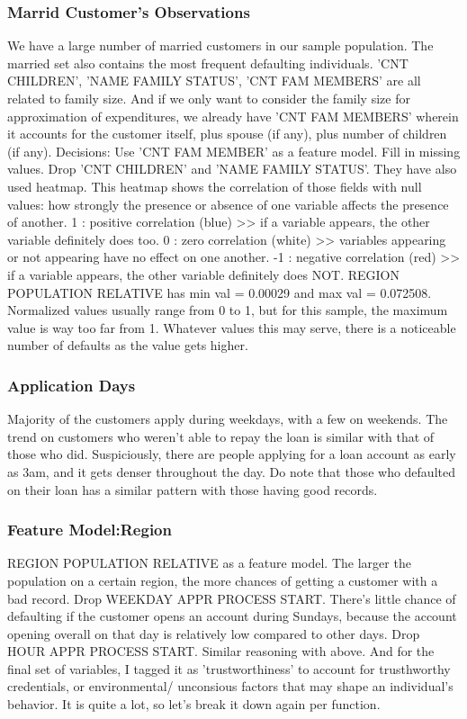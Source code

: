 \documentclass[twoside,a4paper]{article}
\begin{document}
\subsubsection{Marrid Customer's Observations}
We have a large number of married customers in our sample population. The married set also contains the most frequent defaulting individuals.
'CNT CHILDREN', 'NAME FAMILY STATUS', 'CNT FAM MEMBERS' are all related to family size. And if we only want to consider the family size for approximation of expenditures, we already have 'CNT FAM MEMBERS' wherein it accounts for the customer itself, plus spouse (if any), plus number of children (if any).
Decisions:
Use 'CNT FAM MEMBER' as a feature model. Fill in missing values.
Drop 'CNT CHILDREN' and 'NAME FAMILY STATUS'.
They have also used heatmap. This heatmap shows the correlation of those fields with null values: how strongly the presence or absence of one variable affects the presence of another.
1 : positive correlation (blue) >> if a variable appears, the other variable definitely does too.
0 : zero correlation (white) >> variables appearing or not appearing have no effect on one another.
-1 : negative correlation (red) >> if a variable appears, the other variable definitely does NOT.
REGION POPULATION RELATIVE has min val = 0.00029 and max val = 0.072508. Normalized values usually range from 0 to 1, but for this sample, the maximum value is way too far from 1. Whatever values this may serve, there is a noticeable number of defaults as the value gets higher.
\subsubsection{Application Days}
Majority of the customers apply during weekdays, with a few on weekends. The trend on customers who weren't able to repay the loan is similar with that of those who did.
Suspiciously, there are people applying for a loan account as early as 3am, and it gets denser throughout the day. Do note that those who defaulted on their loan has a similar pattern with those having good records.
\subsubsection{Feature Model:Region}
 REGION POPULATION RELATIVE as a feature model. The larger the population on a certain region, the more chances of getting a customer with a bad record.
Drop WEEKDAY APPR PROCESS START. There's little chance of defaulting if the customer opens an account during Sundays, because the account opening overall on that day is relatively low compared to other days.
Drop HOUR APPR PROCESS START. Similar reasoning with above.
And for the final set of variables, I tagged it as 'trustworthiness' to account for trusthworthy credentials, or environmental/ unconsious factors that may shape an individual's behavior. It is quite a lot, so let's break it down again per function.
\end{document}
